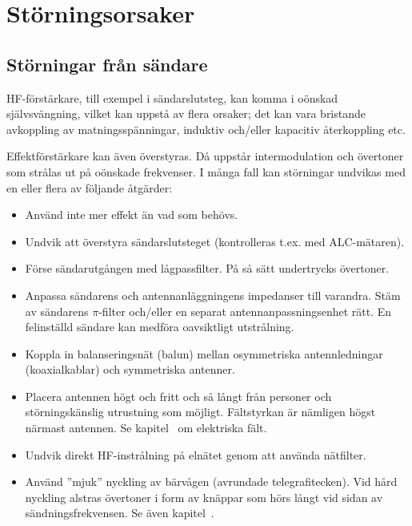 \section{Störningsorsaker}
\label{sec:storningsorsaker}

\subsection{Störningar från sändare}

HF-förstärkare, till exempel i sändarslutsteg, kan komma i oönskad självsvängning,
vilket kan uppstå av flera orsaker; det kan vara bristande avkoppling av
matningsspänningar, induktiv och/eller kapacitiv återkoppling etc.

Effektförstärkare kan även överstyras.
Då uppstår intermodulation och övertoner som strålas ut på oönskade frekvenser.
I många fall kan störningar undvikas med en eller flera av följande åtgärder:

\begin{itemize}
\item Använd inte mer effekt än vad som behövs.
\item Undvik att överstyra sändarslutsteget (kontrolleras t.ex. med
  ALC-mätaren).
\item Förse sändarutgången med lågpassfilter.
  På så sätt undertrycks övertoner.
\item Anpassa sändarens och antennanläggningens impedanser till varandra.
  Stäm av sändarens \(\pi\)-filter och/eller en separat antennanpassningsenhet
  rätt.
  En felinställd sändare kan medföra oavsiktligt utstrålning.
\item Koppla in balanseringsnät (balun) mellan osymmetriska antennledningar
  (koaxialkablar) och symmetriska antenner.
\item Placera antennen högt och fritt och så långt från personer och
  störningskänslig utrustning som möjligt.
  Fältstyrkan är nämligen högst närmast antennen.
  Se kapitel~ om elektriska fält.
\item Undvik direkt HF-instrålning på elnätet genom att använda nätfilter.
\item Använd ''mjuk'' nyckling av bärvågen (avrundade telegrafitecken).
  Vid hård nyckling alstras övertoner i form av knäppar som hörs långt vid
  sidan av sändningsfrekvensen. Se även kapitel~.
\end{itemize}


